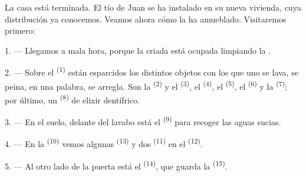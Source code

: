 %
%

\VUsaut{6.0mm}
\VUsaut{1.4mm}
\VUsaut{0.4mm}
\VUsaut{2.2mm}

La casa está terminada. El tío de Juan se ha instalado en su nueva
vivienda, cuya distribución ya conocemos. Veamos ahora cómo la ha
amueblado. Visitaremos primero:

\VUsaut{3.0mm}

1. --- Llegamos a mala hora, porque la criada está ocupada limpiando la
.

2. --- Sobre el  \textsuperscript{(1)} están esparcidos los distintos
objetos con los que uno se lava, se peina, en una palabra, se arregla.
Son la  \textsuperscript{(2)} y el  \textsuperscript{(3)}, el
 \textsuperscript{(4)}, el  \textsuperscript{(5)}, el
 \textsuperscript{(6)} y la  \textsuperscript{(7)}; por último,
un  \textsuperscript{(8)} de elixir dentífrico.

3. --- En el suelo, delante del lavabo está el 
\textsuperscript{(9)} para recoger las aguas sucias.

4. --- En la  \textsuperscript{(10)} vemos algunas 
\textsuperscript{(13)} y dos  \textsuperscript{(11)} en el
 \textsuperscript{(12)}.

5. --- Al otro lado de la puerta está el 
\textsuperscript{(14)}, que guarda la  \textsuperscript{(15)}.

